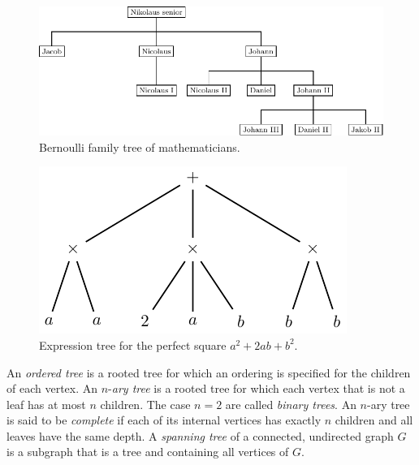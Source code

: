 \begin{figure}[!htbp]
\centering
{}
\includegraphics{image/trees-forests/Bernoulli-family-tree}
\caption{Bernoulli family tree of mathematicians.}
\label{fig:trees_forests:Bernoulli_family_tree}
\end{figure}

\begin{figure}[!htbp]
\centering
{}
\includegraphics{image/trees-forests/expression-tree-perfect-square}
\caption{Expression tree for the perfect square $a^2 + 2ab + b^2$.}
\label{fig:trees_forests:expression_tree_perfect_square}
\end{figure}

An \emph{ordered tree} is a
rooted tree for which an ordering is specified for
the children of each vertex. An
$n$-\emph{ary tree} is a rooted tree for which
each vertex that is not a leaf has at most $n$
children. The case $n = 2$ are called
\emph{binary trees}. An $n$-ary
tree is said to be \emph{complete} if each of its
internal vertices has exactly $n$
children and all leaves have
the same depth. A
\emph{spanning tree} of a connected, undirected
graph $G$ is a subgraph that is a tree and containing all vertices of
$G$.

